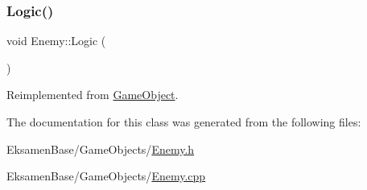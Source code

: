 \subsubsection{\texorpdfstring{Logic()}{Logic()}}
{\footnotesize\ttfamily void Enemy\+::\+Logic (\begin{DoxyParamCaption}{ }\end{DoxyParamCaption})\hspace{0.3cm}{\ttfamily [virtual]}}



Reimplemented from \mbox{\hyperlink{class_game_object_a79510ffc77339fe850491dce9f580fa9}{Game\+Object}}.



The documentation for this class was generated from the following files\+:\begin{DoxyCompactItemize}
\item 
Eksamen\+Base/\+Game\+Objects/\mbox{\hyperlink{_enemy_8h}{Enemy.\+h}}\item 
Eksamen\+Base/\+Game\+Objects/\mbox{\hyperlink{_enemy_8cpp}{Enemy.\+cpp}}\end{DoxyCompactItemize}
